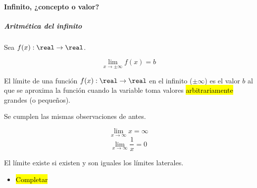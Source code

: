 \paragraph{Infinito, ¿concepto o valor?}
\subparagraph{Aritmética del infinito}

\begin{defn}
Sea $f(x):\real\to\real$.

\[\lim_{x\to \pm\infty} f(x) = b\]

El límite de una función $f(x):\real\to\real$ en el infinito ($\pm\infty$) es el valor $b$ al que se aproxima la función cuando la variable toma valores \hl{arbitrariamente} grandes (o pequeños).
\end{defn}

\obs Se cumplen las mismas observaciones de antes.

\begin{example}
	\[\lim_{x\to\infty}x=\infty\]
	\[\lim_{x\to\infty}\frac{1}{x}=0\]
\end{example}

\begin{defn} 
	El límite existe si existen y son iguales los límites laterales. 
\end{defn}

\begin{example}
	\begin{itemize}
		\item \hl{Completar}
	\end{itemize}
\end{example}




